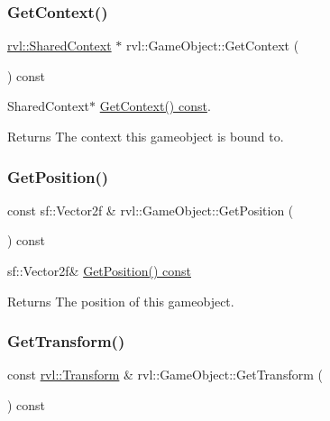 \subsubsection{\texorpdfstring{Get\+Context()}{GetContext()}}
{\footnotesize\ttfamily \hyperlink{structrvl_1_1_shared_context}{rvl\+::\+Shared\+Context} $\ast$ rvl\+::\+Game\+Object\+::\+Get\+Context (\begin{DoxyParamCaption}{ }\end{DoxyParamCaption}) const}



Shared\+Context$\ast$ \hyperlink{classrvl_1_1_game_object_aa03752d8c34914ee01c9e06d2bb661d0}{Get\+Context() const}. 

\begin{DoxyReturn}{Returns}
The context this gameobject is bound to. 
\end{DoxyReturn}
\mbox{\label{classrvl_1_1_game_object_a11cc37db9185b82c7df969abac1a4525}} 
\subsubsection{\texorpdfstring{Get\+Position()}{GetPosition()}}
{\footnotesize\ttfamily const sf\+::\+Vector2f \& rvl\+::\+Game\+Object\+::\+Get\+Position (\begin{DoxyParamCaption}{ }\end{DoxyParamCaption}) const}



sf\+::\+Vector2f\& \hyperlink{classrvl_1_1_game_object_a11cc37db9185b82c7df969abac1a4525}{Get\+Position() const} 

\begin{DoxyReturn}{Returns}
The position of this gameobject. 
\end{DoxyReturn}
\mbox{\label{classrvl_1_1_game_object_a615702097ce6345c12751c6ae2f33723}} 
\subsubsection{\texorpdfstring{Get\+Transform()}{GetTransform()}}
{\footnotesize\ttfamily const \hyperlink{classrvl_1_1_transform_component}{rvl\+::\+Transform} \& rvl\+::\+Game\+Object\+::\+Get\+Transform (\begin{DoxyParamCaption}{ }\end{DoxyParamCaption}) const}



